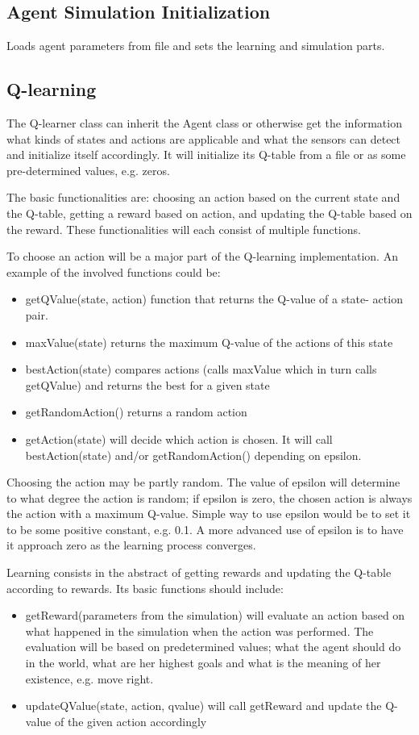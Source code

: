 \documentclass{article}
\begin{document}
\subsection{Agent Simulation Initialization}
Loads agent parameters from file and sets the learning and simulation parts.


\subsection{Q-learning}
The Q-learner class can inherit the Agent class or otherwise get the information
what kinds of states and actions are applicable and what the sensors can detect
and initialize itself accordingly. It will initialize its Q-table from a file or
as some pre-determined values, e.g. zeros.

The basic functionalities are: choosing an action based on the current state and
the Q-table, getting a reward based on action, and updating the Q-table based on
the reward. These functionalities will each consist of multiple functions.

To choose an action will be a major part of the Q-learning implementation. An
example of the involved functions could be:
\begin{itemize}
  \item getQValue(state, action) function that returns the Q-value of a state-
    action pair.
  \item maxValue(state) returns the maximum Q-value of the actions of this state
  \item bestAction(state) compares actions (calls maxValue which in turn calls
    getQValue) and returns the best for a given state
  \item getRandomAction() returns a random action
  \item getAction(state) will decide which action is chosen. It will call
    bestAction(state) and/or getRandomAction() depending on epsilon.
\end{itemize}
Choosing the action may be partly random. The value of epsilon will determine to
what degree the action is random; if epsilon is zero, the chosen action is always
the action with a maximum Q-value. Simple way to use epsilon would be to set it
to be some positive constant, e.g. 0.1. A more advanced use of epsilon is to have
it approach zero as the learning process converges.

Learning consists in the abstract of getting rewards and updating the Q-table
according to rewards. Its basic functions should include:
\begin{itemize}
  \item getReward(parameters from the simulation) will evaluate an action based
  on what happened in the simulation when the action was performed. The evaluation
  will be based on predetermined values; what the agent should do in the world,
  what are her highest goals and what is the meaning of her existence, e.g. move
  right.
  \item updateQValue(state, action, qvalue) will call getReward and update the
  Q-value of the given action accordingly
\end{itemize}
\end{document}
